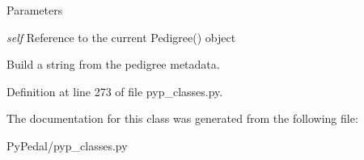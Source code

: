 \begin{DoxyParams}{Parameters}
\item[{\em self}]Reference to the current Pedigree() object \begin{DoxyVerb}Build a string from the pedigree metadata.\end{DoxyVerb}
 \end{DoxyParams}


Definition at line 273 of file pyp\_\-classes.py.



The documentation for this class was generated from the following file:\begin{DoxyCompactItemize}
\item 
PyPedal/pyp\_\-classes.py\end{DoxyCompactItemize}
